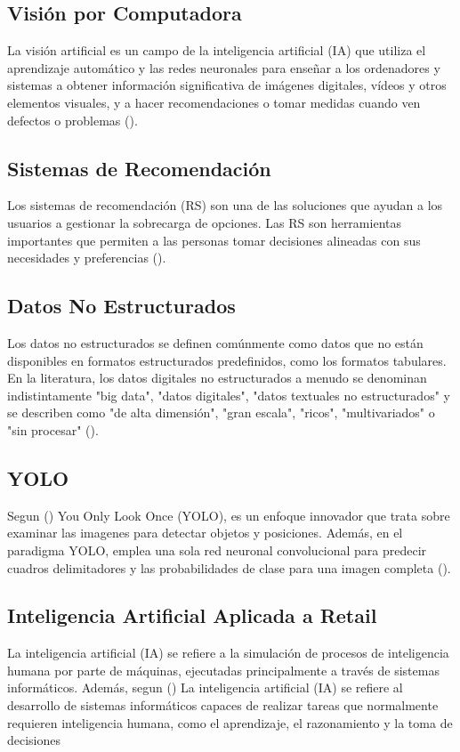 \subsection{Visión por Computadora}
La visión artificial es un campo de la inteligencia artificial (IA) que utiliza el aprendizaje automático y las redes neuronales para enseñar a los ordenadores y sistemas a obtener información significativa de imágenes digitales, vídeos y otros elementos visuales, y a hacer recomendaciones o tomar medidas cuando ven defectos o problemas (\cite{IBM2023vision}).

\subsection{Sistemas de Recomendación}
Los sistemas de recomendación (RS) son una de las soluciones que ayudan a los usuarios a gestionar la sobrecarga de opciones. Las RS son herramientas importantes que permiten a las personas tomar decisiones alineadas con sus necesidades y preferencias (\cite{Amin2020}).

\subsection{Datos No Estructurados}
Los datos no estructurados se definen comúnmente como datos que no están disponibles en formatos estructurados predefinidos, como los formatos tabulares. En la literatura, los datos digitales no estructurados a menudo se denominan indistintamente "big data", "datos digitales", "datos textuales no estructurados" y se describen como "de alta dimensión", "gran escala", "ricos", "multivariados" o "sin procesar" (\cite{sarmiento2023challenges}).


\subsection{YOLO}
Segun (\cite{Redmon2016YOLO}) You Only Look Once (YOLO), es un enfoque innovador que trata sobre examinar las imagenes para detectar objetos y posiciones. Además, en el paradigma YOLO, emplea una sola red neuronal convolucional para predecir cuadros delimitadores y las probabilidades de clase para una imagen completa (\cite{Hussain2023YOLO}).


\subsection{Inteligencia Artificial Aplicada a Retail}
La inteligencia artificial (IA) se refiere a la simulación de procesos de inteligencia humana por parte de máquinas, ejecutadas principalmente a través de sistemas informáticos. Además, segun (\cite{Cocco2022}) La inteligencia artificial (IA) se refiere al desarrollo de sistemas informáticos capaces de realizar tareas que normalmente requieren inteligencia humana, como el aprendizaje, el razonamiento y la toma de decisiones



